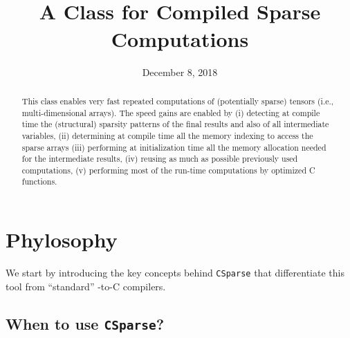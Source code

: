 \documentclass[11pt]{article}
\title{\sc \CS \\[1em]\Large A \matlab{} Class for Compiled Sparse Computations}
\author{\jph}
\date{December 8, 2018}
\newcommand{\CS}{\texttt{CSparse}}
\begin{document}
                        \maketitle

\begin{abstract}
  This class enables very fast repeated computations of (potentially
  sparse) tensors (i.e., multi-dimensional arrays). The speed gains
  are enabled by (i) detecting at compile time the (structural)
  sparsity patterns of the final results and also of all intermediate
  variables, (ii) determining at compile time all the memory indexing
  to access the sparse arrays (iii) performing at initialization time
  all the memory allocation needed for the intermediate results, (iv)
  reusing as much as possible previously used computations, (v)
  performing most of the run-time computations by optimized C
  functions.
\end{abstract}

\tableofcontents

\newpage

\section{Phylosophy}

We start by introducing the key concepts behind \CS{} that
differentiate this tool from ``standard'' \matlab-to-C compilers.

\subsection{When to use \CS?}
\end{document}
